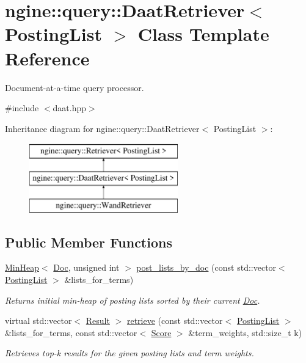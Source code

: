 \hypertarget{classngine_1_1query_1_1DaatRetriever}{}\section{ngine\+:\+:query\+:\+:Daat\+Retriever$<$ Posting\+List $>$ Class Template Reference}
\label{classngine_1_1query_1_1DaatRetriever}


Document-\/at-\/a-\/time query processor.  




{\ttfamily \#include $<$daat.\+hpp$>$}

Inheritance diagram for ngine\+:\+:query\+:\+:Daat\+Retriever$<$ Posting\+List $>$\+:\begin{figure}[H]
\begin{center}
\leavevmode
\includegraphics[height=3.000000cm]{classngine_1_1query_1_1DaatRetriever}
\end{center}
\end{figure}
\subsection*{Public Member Functions}
\begin{DoxyCompactItemize}
\item 
\hyperlink{classngine_1_1MinHeap}{Min\+Heap}$<$ \hyperlink{structngine_1_1Doc}{Doc}, unsigned int $>$ \hyperlink{classngine_1_1query_1_1DaatRetriever_ab6d86f821cc0755633d8c8cca9b0916a}{post\+\_\+lists\+\_\+by\+\_\+doc} (const std\+::vector$<$ \hyperlink{classngine_1_1PostingList}{Posting\+List} $>$ \&lists\+\_\+for\+\_\+terms)
\begin{DoxyCompactList}\small\item\em Returns initial min-\/heap of posting lists sorted by their current \hyperlink{structngine_1_1Doc}{Doc}. \end{DoxyCompactList}\item 
virtual std\+::vector$<$ \hyperlink{structngine_1_1query_1_1Result}{Result} $>$ \hyperlink{classngine_1_1query_1_1DaatRetriever_a348228b0d8d52b38fee84482aa5093e8}{retrieve} (const std\+::vector$<$ \hyperlink{classngine_1_1PostingList}{Posting\+List} $>$ \&lists\+\_\+for\+\_\+terms, const std\+::vector$<$ \hyperlink{structngine_1_1Score}{Score} $>$ \&term\+\_\+weights, std\+::size\+\_\+t k)
\begin{DoxyCompactList}\small\item\em Retrieves top-\/k results for the given posting lists and term weights. \end{DoxyCompactList}\end{DoxyCompactItemize}


